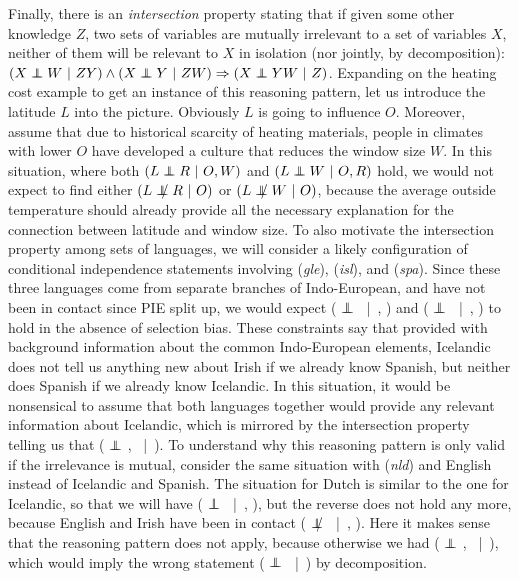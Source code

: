 Finally, there is an \textit{intersection} property stating that if given some other knowledge $Z$, two sets of variables are mutually irrelevant to a set of variables $X$, neither of them will be relevant to $X$ in isolation (nor jointly, by decomposition): $(X \independent W\ |\ ZY)  \wedge (X \independent Y\ |\ ZW) \Rightarrow (X \independent YW\ |\ Z)$. Expanding on the heating cost example to get an instance of this reasoning pattern, let us introduce the latitude $L$ into the picture. Obviously $L$ is going to influence $O$. Moreover, assume that due to historical scarcity of heating materials, people in climates with lower $O$ have developed a culture that reduces the window size $W$. In this situation, where both $(L \independent R\ |\ O, W)$ and $(L \independent W\ |\ O, R)$ hold, we would not expect to find either $(L \notindep R\ |\ O)$ or $(L \notindep W\ |\ O)$, because the average outside temperature should already provide all the necessary explanation for the connection between latitude and window size. To also motivate the intersection property among sets of languages, we will consider a likely configuration of conditional independence statements involving  (\textit{gle}),  (\textit{isl}), and  (\textit{spa}). Since these three languages come from separate branches of Indo-European, and have not been in contact since PIE split up, we would expect ( $\independent$ \ |\ , ) and ( $\independent$ \ |\ , ) to hold in the absence of selection bias. These constraints say that provided with background information about the common Indo-European elements, Icelandic does not tell us anything new about Irish if we already know Spanish, but neither does Spanish if we already know Icelandic. In this situation, it would be nonsensical to assume that both languages together would provide any relevant information about Icelandic, which is mirrored by the intersection property telling us that ( $\independent$ , \ |\ ). To understand why this reasoning pattern is only valid if the irrelevance is mutual, consider the same situation with  (\textit{nld}) and English instead of Icelandic and Spanish. The situation for Dutch is similar to the one for Icelandic, so that we will have ( $\independent$ \ |\ , ), but the reverse does not hold any more, because English and Irish have been in contact ( $\notindep$ \ |\ , ).  Here it makes sense that the reasoning pattern does not apply, because otherwise we had ( $\independent$ , \ |\ ), which would imply the wrong statement ( $\independent$ \ |\ ) by decomposition.

